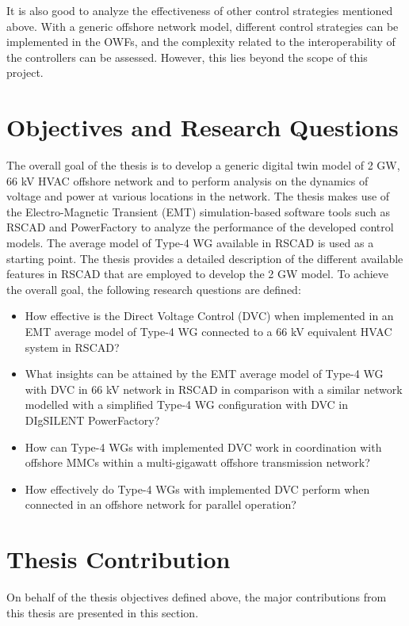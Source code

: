 It is also good to analyze the effectiveness of other control strategies mentioned above. With a generic offshore network model, different control strategies can be implemented in the \gls{OWF}s, and the complexity related to the interoperability of the controllers can be assessed. However, this lies beyond the scope of this project.

\section{Objectives and Research Questions}
The overall goal of the thesis is to develop a generic digital twin model of 2 GW, 66 kV \gls{HVAC} offshore network and to perform analysis on the dynamics of voltage and power at various locations in the network. The thesis makes use of the Electro-Magnetic Transient (\gls{EMT}) simulation-based software tools such as RSCAD and PowerFactory to analyze the performance of the developed control models. The average model of Type-4 \gls{WG} available in RSCAD is used as a starting point. The thesis provides a detailed description of the different available features in RSCAD that are employed to develop the 2 GW model. 
To achieve the overall goal, the following research questions are defined:
\begin{itemize}
    \item How effective is the Direct Voltage Control (\gls{DVC}) when implemented in an \gls{EMT} average model of Type-4 \gls{WG} connected to a 66 kV equivalent \gls{HVAC} system in RSCAD?
    
    \item What insights can be attained by the \gls{EMT} average model of Type-4 \gls{WG} with \gls{DVC} in 66 kV network in RSCAD in comparison with a similar network modelled with a simplified Type-4 \gls{WG} configuration with \gls{DVC} in DIgSILENT PowerFactory?
    
    \item How can Type-4 \gls{WG}s with implemented \gls{DVC} work in coordination with offshore \gls{MMC}s within a multi-gigawatt offshore transmission network?
    
    \item How effectively do Type-4 \gls{WG}s with implemented \gls{DVC} perform when connected in an offshore network for parallel operation?

\end{itemize}

\section{Thesis Contribution}
On behalf of the thesis objectives defined above, the major contributions from this thesis are presented in this section.

